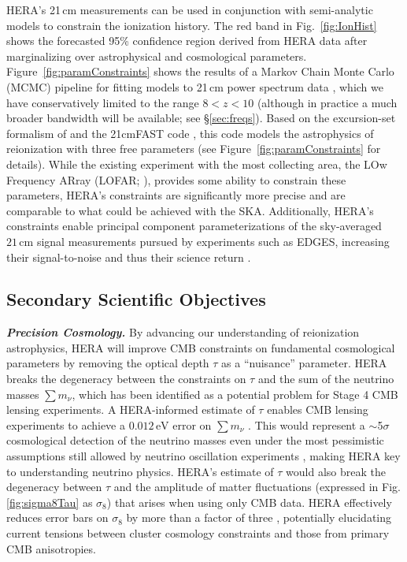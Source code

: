 \documentclass[preprint,11pt]{aastex}
\begin{document}
HERA's 21\,cm measurements can be used in conjunction with semi-analytic models to constrain the ionization history. 
The red band in Fig.~\ref{fig:IonHist} shows the forecasted 95\% confidence region derived from HERA data after marginalizing over astrophysical and cosmological parameters.
Figure~\ref{fig:paramConstraints} shows the results of a Markov Chain Monte
Carlo (MCMC) pipeline for fitting models to 21\,cm power spectrum data \citep{greig_and_mesinger2015}, which we have conservatively limited to the range $8 < z < 10$ (although in practice a much broader bandwidth will be available; see \S\ref{sec:freqs}).
Based on the excursion-set formalism of
\citet{furlanetto_et_al2004} and the 21cmFAST code \citep{mesinger_et_al2011},
this code models the astrophysics of
reionization with three free parameters (see Figure~\ref{fig:paramConstraints} for details). 
While the existing experiment with the most collecting area, 
the LOw Frequency ARray (LOFAR; \citealt{2013A&A...556A...2V, yatawatta_et_al2013}),
provides some ability to constrain these parameters,
HERA's constraints are significantly more precise and are comparable
to what could be achieved with the SKA. 
Additionally, HERA's constraints enable principal component parameterizations of the
sky-averaged $21\,\textrm{cm}$ signal measurements pursued by experiments such as EDGES, increasing their signal-to-noise and thus their science return \citep{liu_parsons2015}.


\subsection{Secondary Scientific Objectives}%

\emph{\textbf{Precision Cosmology.}}
\label{sec:tau}
By advancing our understanding of reionization astrophysics, HERA will improve CMB constraints on 
fundamental cosmological parameters by
removing the optical depth
$\tau$ as a ``nuisance'' parameter. HERA breaks the degeneracy between the
constraints on $\tau$ and the sum of the neutrino masses $\sum m_\nu$, which has
been identified as a potential problem for Stage 4 CMB lensing experiments. A
HERA-informed estimate of $\tau$ enables CMB lensing experiments to achieve a
$0.012\,\textrm{eV}$ error on $\sum m_\nu$ \citep{liu_et_al2015}. This would
represent a $\sim$5$\sigma$ cosmological detection of the neutrino masses even
under the most pessimistic assumptions
still allowed by neutrino oscillation experiments
\citep{allison_et_al2015}, making HERA key to understanding neutrino
physics. HERA's estimate of $\tau$ would also break the degeneracy between
$\tau$ and the amplitude of matter fluctuations (expressed in Fig.
\ref{fig:sigma8Tau} as $\sigma_8$) that arises when using only
CMB data. HERA effectively reduces error bars on $\sigma_8$ by more
than a factor of three \citep{liu_et_al2015}, potentially elucidating
current tensions between cluster cosmology constraints and those from primary
CMB anisotropies.
\end{document}
